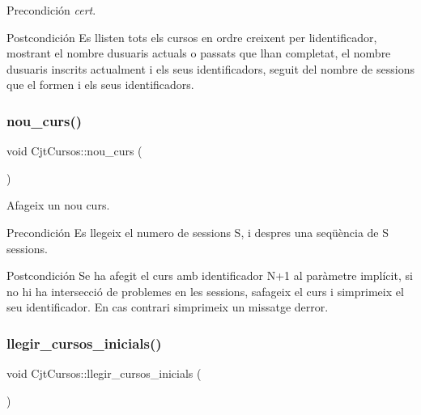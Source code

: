 \begin{DoxyPrecond}{Precondición}
{\itshape cert}. 
\end{DoxyPrecond}
\begin{DoxyPostcond}{Postcondición}
Es llisten tots els cursos en ordre creixent per l\textquotesingle{}identificador, mostrant el nombre d\textquotesingle{}usuaris actuals o passats que l\textquotesingle{}han completat, el nombre d\textquotesingle{}usuaris inscrits actualment i els seus identificadors, seguit del nombre de sessions que el formen i els seus identificadors. 
\end{DoxyPostcond}
\mbox{\label{class_cjt_cursos_a3d4778b4572a99e1109d6376f439255e}} 
\subsubsection{\texorpdfstring{nou\+\_\+curs()}{nou\_curs()}}
{\footnotesize\ttfamily void Cjt\+Cursos\+::nou\+\_\+curs (\begin{DoxyParamCaption}{ }\end{DoxyParamCaption})}



Afageix un nou curs. 

\begin{DoxyPrecond}{Precondición}
Es llegeix el numero de sessions S, i despres una seqüència de S sessions. 
\end{DoxyPrecond}
\begin{DoxyPostcond}{Postcondición}
Se ha afegit el curs amb identificador N+1 al paràmetre implícit, si no hi ha intersecció de problemes en les sessions, s\textquotesingle{}afageix el curs i s\textquotesingle{}imprimeix el seu identificador. En cas contrari s\textquotesingle{}imprimeix un missatge d\textquotesingle{}error. 
\end{DoxyPostcond}
\mbox{\label{class_cjt_cursos_a970aa3d7caa26ed983ccd71e4bfd0adf}} 
\subsubsection{\texorpdfstring{llegir\+\_\+cursos\+\_\+inicials()}{llegir\_cursos\_inicials()}}
{\footnotesize\ttfamily void Cjt\+Cursos\+::llegir\+\_\+cursos\+\_\+inicials (\begin{DoxyParamCaption}{ }\end{DoxyParamCaption})}



